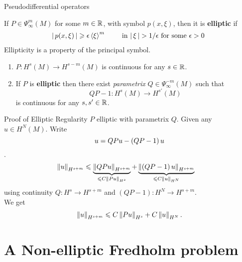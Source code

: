 \documentclass{beamer}
\begin{document}
\begin{frame}{Pseudodifferential operators}

If $P \in \Psi^{m}_{\infty}(M)$ for some $m \in \R$, with symbol $p(x, \xi)$, then it is \textbf{elliptic} if 
\begin{align*}
    \abs{p(x, \xi)} \geq \epsilon \sym[\xi]^m \tag*{ in $\abs{\xi} > 1/\epsilon$ for some $\epsilon > 0$ } 
\end{align*}
Ellipticity is a property of the principal symbol. 
\pause 

\begin{lemma}

    \begin{enumerate}
        \item $P : H^{s}(M) \to H^{s - m}(M)$ is continuous for any $s \in \R$. 
        \item If $P$ is \textbf{elliptic} then there exist \textit{parametrix} $Q \in \Psi^{-m}_{\infty}(M)$ such that 
        $$QP - 1: H^{s}(M) \to H^{s'}(M)$$
         is continuous for any $s, s' \in \R$. 
    \end{enumerate}
\end{lemma}
\end{frame} 

\begin{frame}{Proof of Elliptic Regularity}
$P$ elliptic with parametrix $Q$. 
Given any $u \in H^N(M)$. Write $$u = QP u -  \brac{QP - 1} u$$. 
\begin{align*}
\norm[u]_{H^{s + m}} 
&\leq \underbrace{\norm[QPu]_{H^{s + m}}}_{\leq C \norm[Pu]_{H^s}} + \underbrace{\norm[\brac{QP - 1}u]_{H^{s +m}}}_{\leq C \norm[u]_{H^N}}
\end{align*}
using continuity $Q: H^{s} \to H^{s + m}$ and $(QP - 1): H^{N} \to H^{s + m}$.  \\
We get 
\begin{align*}
\norm[u]_{H^{s + m}} \leq C \norm[Pu]_{H^s} + C \norm[u]_{H^N}. 
\end{align*}
\end{frame} 


\section{A Non-elliptic Fredholm problem}
\end{document}
